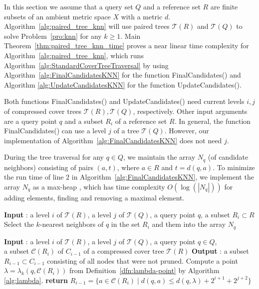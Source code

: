 \documentclass[a4paper,UKenglish,cleveref, autoref]{lipics-v2019}
\numberwithin{algocf}{section}
\theoremstyle{definition}
\theoremstyle{definition}
\theoremstyle{definition}
\theoremstyle{plain}
\newcommand{\C}{\mathcal{C}}
\newcommand{\T}{\mathcal{T}}
\begin{document}
In this section we assume that a query set $Q$ and a reference set $R$ are finite subsets of an ambient metric space $X$ with a metric $d$.
Algorithm~\ref{alg:paired_tree_knn} will use paired trees $\T(R)$ and $\T(Q)$ to solve Problem~\ref{pro:knn} for any $k\geq 1$.
Main Theorem~\ref{thm:paired_tree_knn_time} proves a near linear time complexity for Algorithm~\ref{alg:paired_tree_knn}, which runs Algorithm~\ref{alg:StandardCoverTreeTraversal} by using Algorithm~\ref{alg:FinalCandidatesKNN} for the function FinalCandidates() and Algorithm \ref{alg:UpdateCandidatesKNN} for the function UpdateCandidates(). 
\medskip

Both functions FinalCandidates() and UpdateCandidates() need current levels $i,j$ of compressed cover trees $\T(R),\T(Q)$, respectively.
Other input arguments are a query point $q$ and a subset $R_i$ of a reference set $R$. 
In general, the function FinalCandidates() can use a level $j$ of a tree $\T(Q)$.
However, our implementation of Algorithm~\ref{alg:FinalCandidatesKNN} does not need $j$. 
\medskip

During the tree traversal for any $q \in Q$, we maintain the array $N_q$ (of candidate neighbors) consisting of pairs $(a,t)$, where $a \in R$ and $t = d(q,a)$. 
To minimize the run time of line $2$ in Algorithm~\ref{alg:FinalCandidatesKNN}, we implement the array $N_q$ as a max-heap \cite[section~6.5]{Cormen1990}, which has time complexity $O(\log(|N_q|))$ for adding elements, finding and removing a maximal element. 

\begin{algorithm}
\caption{This function FinalCandidates() is used in Algorithm \ref{alg:StandardCoverTreeTraversal} to get final Algorithm~\ref{alg:paired_tree_knn}. }
\label{alg:FinalCandidatesKNN}
\begin{algorithmic}[1]
\STATE \textbf{Input} : a level $i$ of $\T(R)$, a level $j$ of $\T(Q)$, a query point $q$, a subset $R_i \subset R$
\STATE Select the $k$-nearest neighbors of $q$ in the set $R_i$ and them into the array $N_q$ 
\end{algorithmic}
\end{algorithm}

\begin{algorithm}
\caption{This function UpdateCandidates() is used in Algorithm \ref{alg:StandardCoverTreeTraversal} to get Algorithm~\ref{alg:paired_tree_knn}. }
\label{alg:UpdateCandidatesKNN}
\begin{algorithmic}[1]
\STATE \textbf{Input} : a level $i$ of $\T(R)$, a level $j$ of $\T(Q)$, a query point $q\in Q$, \\ a subset $\mathcal{C}(R_i)$ of $C_{i-1}$ of a compressed cover tree $\T(R)$
\STATE \textbf{Output} : a subset $R_{i-1}\subset C_{i-1}$ consisting of all nodes that were not pruned. 
\STATE Compute a point $\lambda = \lambda_k(q,\C(R_i))$ from Definition~\ref{dfn:lambda-point} by Algorithm \ref{alg:lambda}. \label{line:UpdateCandidatesKNN:lambda}
\STATE \textbf{return} $R_{i-1} = \{a \in \C(R_i) \mid d(q,a) \leq d(q, \lambda) + 2^{i+1} + 2^{j+2}\} $
\label{line:dual_tree_knn_UpdateCandidates:last}
\end{algorithmic}
\end{algorithm}
\end{document}
